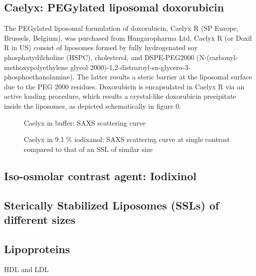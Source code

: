 \subsection{Caelyx: PEGylated liposomal doxorubicin}
The PEGylated liposomal formulation of doxorubicin, Caelyx R (SP Europe, Brussels, Belgium), was purchased from Hungaropharma Ltd. Caelyx R (or Doxil R in US) consist of liposomes formed by fully hydrogenated soy phosphatydilcholine (HSPC), cholesterol, and DSPE-PEG2000 (N-(carbonyl-methoxypolyethylene glycol 2000)-1,2-distearoyl-sn-glycero-3-phosphoethanolamine). The latter results a steric barrier at the liposomal surface due to the PEG 2000 residues. Doxorubicin is encapsulated in Caelyx R via an active loading procedure, which results a crystal-like doxorubicin precipitate inside the liposomes, as depicted schematically in figure 0. 

\begin{figure}
	\centering
		
		\caption{Caelyx in buffer: SAXS scattering curve}
		\label{fig:CaelyxSingleContrastSAXS}
\end{figure}

\begin{figure}
	\centering
		
		\caption{Caelyx in 9.1 $\%$ iodixanol: SAXS scattering curve at single contrast compared to that of an SSL of similar size}
		\label{fig:CaelyxIodixanolSingleContrast}
\end{figure}



\subsection{Iso-osmolar contrast agent: Iodixinol}
\subsection{Sterically Stabilized Liposomes (SSLs) of different sizes}
\subsection{Lipoproteins}
HDL and LDL

